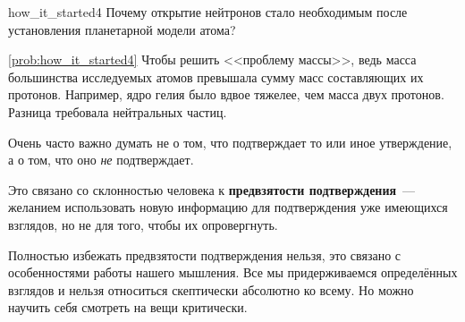 \begin{problem}{}{how_it_started4}
    Почему открытие нейтронов стало необходимым после установления планетарной модели атома?

    \begin{sol}{\ref{prob:how_it_started4}}
        Чтобы решить <<проблему массы>>, ведь масса большинства исследуемых атомов превышала сумму масс составляющих их протонов. Например, ядро гелия было вдвое тяжелее, чем масса двух протонов. Разница требовала нейтральных частиц.
    \end{sol}
\end{problem}

Очень часто важно думать не о том, что подтверждает то или иное утверждение, а о том, что оно \emph{не} подтверждает.

Это связано со склонностью человека к \textbf{предвзятости подтверждения}~--- желанием использовать новую информацию для подтверждения уже имеющихся взглядов, но не для того, чтобы их опровергнуть.

Полностью избежать предвзятости подтверждения нельзя, это связано с особенностями работы нашего мышления. Все мы придерживаемся определённых взглядов и нельзя относиться скептически абсолютно ко всему. Но можно научить себя смотреть на вещи критически.

